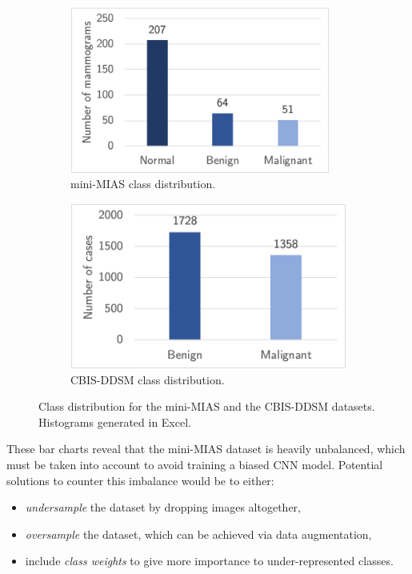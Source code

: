 \begin{figure}[h]
\centering
\begin{subfigure}{.5\textwidth}
  \centering
  \includegraphics[width=0.94\textwidth]{Dissertation/figures/design/mini-mias-balance.png}
  \caption{mini-MIAS class distribution.}
  \label{fig:design-mini-mias-balance}
\end{subfigure}%
\begin{subfigure}{.5\textwidth}
  \centering
  \includegraphics[width=\textwidth]{Dissertation/figures/design/cbis-ddsm-balance.png}
  \caption{CBIS-DDSM class distribution.}
  \label{fig:cbis-ddsm-balance}
\end{subfigure}
\caption{\label{fig:design-datasets-balance}Class distribution for the mini-MIAS and the CBIS-DDSM datasets. Histograms generated in Excel.}
\end{figure}

These bar charts reveal that the mini-MIAS dataset is heavily unbalanced, which must be taken into account to avoid training a biased CNN model. Potential solutions to counter this imbalance would be to either:
\begin{itemize}
    \item \textit{undersample} the dataset by dropping images altogether,
    \item \textit{oversample} the dataset, which can be achieved via data augmentation,
    \item include \textit{class weights} to give more importance to under-represented classes. 
\end{itemize}

